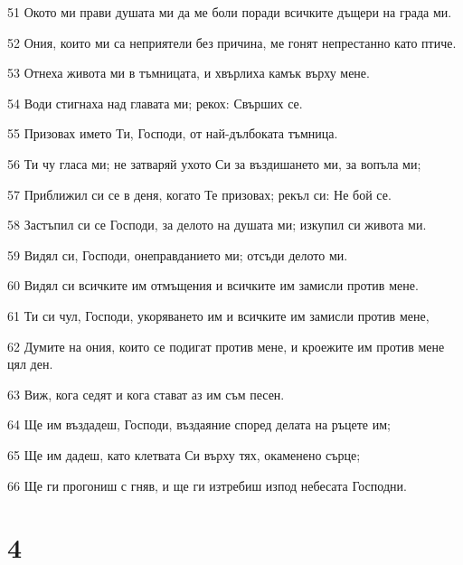 \par 51 Окото ми прави душата ми да ме боли поради всичките дъщери на града ми.
\par 52 Ония, които ми са неприятели без причина, ме гонят непрестанно като птиче.
\par 53 Отнеха живота ми в тъмницата, и хвърлиха камък върху мене.
\par 54 Води стигнаха над главата ми; рекох: Свърших се.
\par 55 Призовах името Ти, Господи, от най-дълбоката тъмница.
\par 56 Ти чу гласа ми; не затваряй ухото Си за въздишането ми, за вопъла ми;
\par 57 Приближил си се в деня, когато Те призовах; рекъл си: Не бой се.
\par 58 Застъпил си се Господи, за делото на душата ми; изкупил си живота ми.
\par 59 Видял си, Господи, онеправданието ми; отсъди делото ми.
\par 60 Видял си всичките им отмъщения и всичките им замисли против мене.
\par 61 Ти си чул, Господи, укоряването им и всичките им замисли против мене,
\par 62 Думите на ония, които се подигат против мене, и кроежите им против мене цял ден.
\par 63 Виж, кога седят и кога стават аз им съм песен.
\par 64 Ще им въздадеш, Господи, въздаяние според делата на ръцете им;
\par 65 Ще им дадеш, като клетвата Си върху тях, окаменено сърце;
\par 66 Ще ги прогониш с гняв, и ще ги изтребиш изпод небесата Господни.

\chapter{4}

